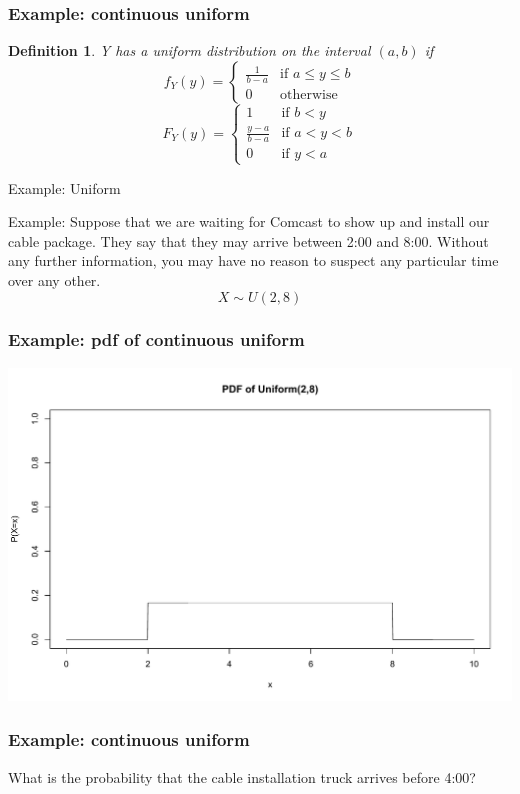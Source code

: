 \documentclass[aspectratio=169, handout]{beamer}
\newtheorem{defn}{Definition}
\numberwithin{equation}{section}
\begin{document}
\begin{frame}
\frametitle{Example: continuous uniform}

\begin{defn}
Y has a uniform distribution on the interval $(a,b)$ if
$$f_Y(y)=\begin{cases} \frac{1}{b-a}& \text{if } a\leq y\leq b\\ 0 & \text{otherwise} \end{cases}$$
$$F_Y(y)=\begin{cases} 1 & \text{if } b<y\\\frac{y-a}{b-a}& \text{if } a<y<b\\ 0 & \text{if } y<a\ \end{cases}$$
\end{defn}

\end{frame}
\begin{frame}{Example: Uniform}

Example: Suppose that we are waiting for Comcast to show up and install our cable package.  They say that they may arrive between 2:00 and 8:00.  Without any further information, you may have no reason to suspect any particular time over any other.
$$X\sim U(2,8)$$

\end{frame}



\begin{frame}
\frametitle{Example: pdf of continuous uniform}
\begin{center}
\includegraphics[width=4 in]{Udists2.pdf}
\end{center}

\end{frame}




\begin{frame}
\frametitle{Example: continuous uniform }
What is the probability that the cable installation truck arrives before 4:00?

\end{frame}
\end{document}
